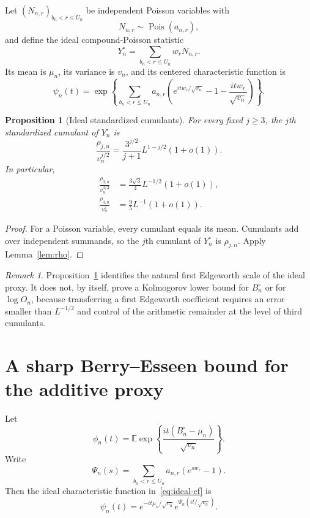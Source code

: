 \documentclass[11pt]{article}
\newtheorem{proposition}[theorem]{Proposition}
\theoremstyle{remark}
\newtheorem{remark}[theorem]{Remark}
\newcommand{\Ee}{\mathbb E}
\newcommand{\Pois}{\operatorname{Pois}}
\begin{document}
Let $(N_{n,r})_{b_n<r\le U_n}$ be independent Poisson variables with
\[
 N_{n,r}\sim\Pois(a_{n,r}),
\]
and define the ideal compound-Poisson statistic
\[
 Y_n^\circ=\sum_{b_n<r\le U_n}w_rN_{n,r}.
\]
Its mean is $\mu_n$, its variance is $v_n$, and its centered characteristic
function is
\begin{equation}
\label{eq:ideal-cf}
 \psi_n(t)=
 \exp\left\{
 \sum_{b_n<r\le U_n}a_{n,r}
 \left(e^{itw_r/\sqrt{v_n}}-1-\frac{itw_r}{\sqrt{v_n}}\right)
 \right\}.
\end{equation}

\begin{proposition}[Ideal standardized cumulants]
\label{prop:cumulants}
For every fixed $j\ge3$, the $j$th standardized cumulant of $Y_n^\circ$
is
\[
 \frac{\rho_{j,n}}{v_n^{j/2}}
 =\frac{3^{j/2}}{j+1}L^{1-j/2}(1+o(1)).
\]
In particular,
\begin{align*}
 \frac{\rho_{3,n}}{v_n^{3/2}}
 &=\frac{3\sqrt3}{4}L^{-1/2}(1+o(1)),\\
 \frac{\rho_{4,n}}{v_n^2}
 &=\frac95L^{-1}(1+o(1)).
\end{align*}
\end{proposition}

\begin{proof}
For a Poisson variable, every cumulant equals its mean.  Cumulants add over
independent summands, so the $j$th cumulant of $Y_n^\circ$ is
$\rho_{j,n}$.  Apply Lemma~\ref{lem:rho}.
\end{proof}

\begin{remark}
Proposition~\ref{prop:cumulants} identifies the natural first Edgeworth
scale of the ideal proxy.  It does not, by itself, prove a Kolmogorov lower
bound for $B_n^\circ$ or for $\log O_n$, because transferring a first
Edgeworth coefficient requires an error smaller than $L^{-1/2}$ and
control of the arithmetic remainder at the level of third cumulants.
\end{remark}

\section{A sharp Berry--Esseen bound for the additive proxy}

Let
\[
 \phi_n(t)=\Ee\exp\left\{
 \frac{it(B_n^\circ-\mu_n)}{\sqrt{v_n}}
 \right\}.
\]
Write
\[
 \Psi_n(s)=\sum_{b_n<r\le U_n}a_{n,r}(e^{sw_r}-1).
\]
Then the ideal characteristic function in~\eqref{eq:ideal-cf} is
\[
 \psi_n(t)=e^{-it\mu_n/\sqrt{v_n}}
 e^{\Psi_n(it/\sqrt{v_n})}.
\]
\end{document}
